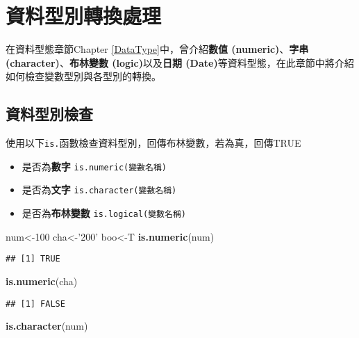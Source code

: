 \documentclass[]{book}
\newenvironment{Shaded}{\begin{snugshade}}{\end{snugshade}}
\newcommand{\KeywordTok}[1]{\textcolor[rgb]{0.13,0.29,0.53}{\textbf{{#1}}}}
\newcommand{\DecValTok}[1]{\textcolor[rgb]{0.00,0.00,0.81}{{#1}}}
\newcommand{\StringTok}[1]{\textcolor[rgb]{0.31,0.60,0.02}{{#1}}}
\newcommand{\NormalTok}[1]{{#1}}
\providecommand{\tightlist}{%
  \setlength{\itemsep}{0pt}\setlength{\parskip}{0pt}}
\begin{document}
\section{資料型別轉換處理}

在資料型態章節Chapter \ref{DataType}中，曾介紹\textbf{數值
(numeric)}、\textbf{字串 (character)}、\textbf{布林變數
(logic)}以及\textbf{日期
(Date)}等資料型態，在此章節中將介紹如何檢查變數型別與各型別的轉換。

\subsection{資料型別檢查}

使用以下\texttt{is.}函數檢查資料型別，回傳布林變數，若為真，回傳TRUE

\begin{itemize}
\tightlist
\item
  是否為\textbf{數字} \texttt{is.numeric(變數名稱)}
\item
  是否為\textbf{文字} \texttt{is.character(變數名稱)}
\item
  是否為\textbf{布林變數} \texttt{is.logical(變數名稱)}
\end{itemize}

\begin{Shaded}
\begin{Highlighting}[]
\NormalTok{num<-}\DecValTok{100}
\NormalTok{cha<-}\StringTok{'200'}
\NormalTok{boo<-T}
\KeywordTok{is.numeric}\NormalTok{(num)}
\end{Highlighting}
\end{Shaded}

\begin{verbatim}
## [1] TRUE
\end{verbatim}

\begin{Shaded}
\begin{Highlighting}[]
\KeywordTok{is.numeric}\NormalTok{(cha)}
\end{Highlighting}
\end{Shaded}

\begin{verbatim}
## [1] FALSE
\end{verbatim}

\begin{Shaded}
\begin{Highlighting}[]
\KeywordTok{is.character}\NormalTok{(num)}
\end{Highlighting}
\end{Shaded}
\end{document}

